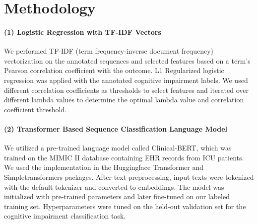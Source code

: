\documentclass[pmlr,twocolumn,10pt]{jmlr} %
\begin{document}
\section{Methodology}
\label{sec:Methodology}  


\label{sec:TFIDF}  
\paragraph{(1) Logistic Regression with TF-IDF Vectors} We performed TF-IDF (term frequency-inverse document frequency) vectorization on the annotated sequences and selected features based on a term's Pearson correlation coefficient with the outcome. L1 Regularized logistic regression was applied with the annotated cognitive impairment labels. We used different correlation coefficients as thresholds to select features and iterated over different lambda values to determine the optimal lambda value and correlation coefficient threshold. 


\label{sec:Transformer}  
\paragraph{(2) Transformer Based Sequence Classification Language Model} We utilized a pre-trained language model called Clinical-BERT, which was trained on the MIMIC II database containing EHR records from ICU patients. We used the implementation in the Huggingface Transformer and Simpletransformers packages. After text preprocessing, input texts were tokenized with the default tokenizer and converted to embeddings. The model was initialized with pre-trained parameters and later fine-tuned on our labeled training set. Hyperparameters were tuned on the held-out validation set for the cognitive impairment classification task.
\end{document}

